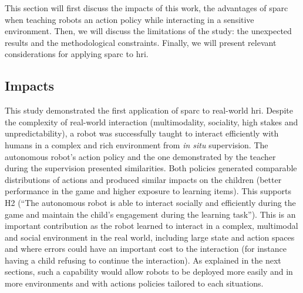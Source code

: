 This section will first discuss the impacts of this work, the advantages of \gls{sparc} when teaching robots an action policy while interacting in a sensitive environment. Then, we will discuss the limitations of the study: the unexpected results and the methodological constraints. Finally, we will present relevant considerations for applying \gls{sparc} to \gls{hri}.

\subsection{Impacts} \label{sec:tuto_impacts}



This study demonstrated the first application of \gls{sparc} to real-world \gls{hri}. Despite the complexity of real-world interaction (multimodality, sociality, high stakes and unpredictability), a robot was successfully taught to interact efficiently with humans in a complex and rich environment from \textit{in situ} supervision. The autonomous robot's action policy and the one demonstrated by the teacher during the supervision presented similarities. Both policies generated comparable distributions of actions and produced similar impacts on the children (better performance in the game and higher exposure to learning items). This supports H2 (``The autonomous robot is able to interact socially and efficiently during the game and maintain the child’s engagement during the learning task''). %
This is an important contribution as the robot learned to interact in a complex, multimodal and social environment in the real world, including large state and action spaces and where errors could have an important cost to the interaction (for instance having a child refusing to continue the interaction). As explained in the next sections, such a capability would allow robots to be deployed more easily and in more environments and with actions policies tailored to each situations.%


